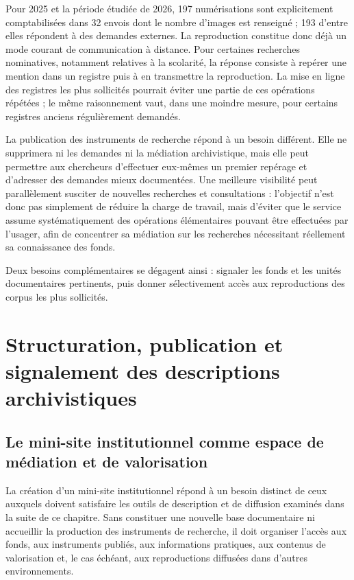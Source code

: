 Pour 2025 et la période étudiée de 2026, 197 numérisations sont explicitement comptabilisées dans 32 envois dont le nombre d'images est renseigné ; 193 d'entre elles répondent à des demandes externes. La reproduction constitue donc déjà un mode courant de communication à distance. Pour certaines recherches nominatives, notamment relatives à la scolarité, la réponse consiste à repérer une mention dans un registre puis à en transmettre la reproduction. La mise en ligne des registres les plus sollicités pourrait éviter une partie de ces opérations répétées ; le même raisonnement vaut, dans une moindre mesure, pour certains registres anciens régulièrement demandés.

La publication des instruments de recherche répond à un besoin différent. Elle ne supprimera ni les demandes ni la médiation archivistique, mais elle peut permettre aux chercheurs d'effectuer eux-mêmes un premier repérage et d'adresser des demandes mieux documentées. Une meilleure visibilité peut parallèlement susciter de nouvelles recherches et consultations : l'objectif n'est donc pas simplement de réduire la charge de travail, mais d'éviter que le service assume systématiquement des opérations élémentaires pouvant être effectuées par l'usager, afin de concentrer sa médiation sur les recherches nécessitant réellement sa connaissance des fonds.

Deux besoins complémentaires se dégagent ainsi : signaler les fonds et les unités documentaires pertinents, puis donner sélectivement accès aux reproductions des corpus les plus sollicités.

\chapter{Structuration, publication et signalement des descriptions archivistiques}

\section{Le mini-site institutionnel comme espace de médiation et de valorisation}

La création d'un mini-site institutionnel répond à un besoin distinct de ceux auxquels doivent satisfaire les outils de description et de diffusion examinés dans la suite de ce chapitre. Sans constituer une nouvelle base documentaire ni accueillir la production des instruments de recherche, il doit organiser l'accès aux fonds, aux instruments publiés, aux informations pratiques, aux contenus de valorisation et, le cas échéant, aux reproductions diffusées dans d'autres environnements.

